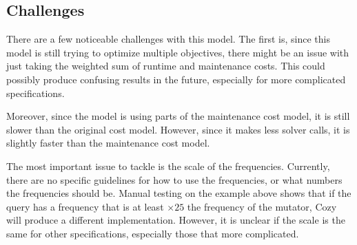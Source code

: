 \subsection{Challenges}
There are a few noticeable challenges with this model. The first is, since this
model is still trying to optimize multiple objectives, there might be an issue
with just taking the weighted sum of runtime and maintenance costs. This could
possibly produce confusing results in the future, especially for more
complicated specifications.

Moreover, since the model is using parts of the maintenance cost model, it is
still slower than the original cost model. However, since it makes less solver
calls, it is slightly faster than the maintenance cost model.

The most important issue to tackle is the scale of the frequencies. Currently,
there are no specific guidelines for how to use the frequencies, or what numbers
the frequencies should be. Manual testing on the example above shows that if the
query has a frequency that is at least $\times 25$ the frequency of the mutator,
Cozy will produce a different implementation. However, it is unclear if the
scale is the same for other specifications, especially those that more
complicated.
